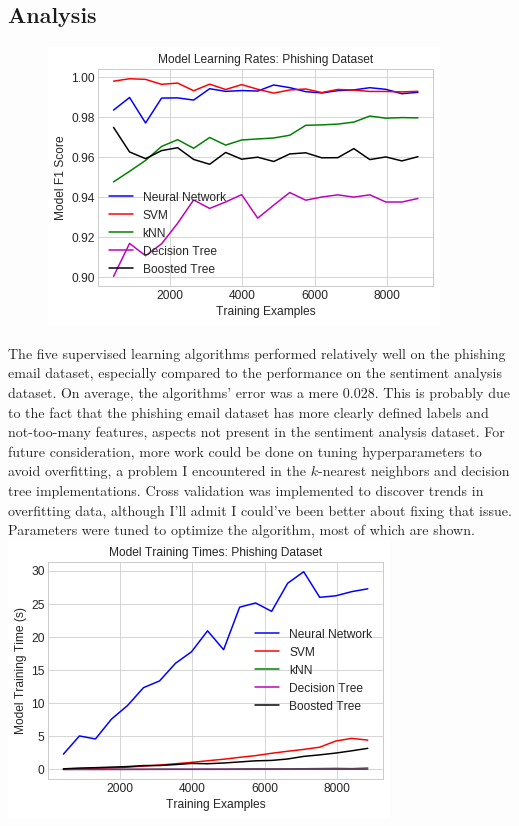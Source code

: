 \documentclass[11pt, a4paper]{article} %
\begin{document}
\subsection{Analysis}
\begin{figure}
\centering
\includegraphics[scale=0.525]{MLR.png}
\end{figure}
The five supervised learning algorithms performed relatively well on the phishing email dataset, especially compared to the performance on the sentiment analysis dataset. On average, the algorithms' error was a mere 0.028. This is probably due to the fact that the phishing email dataset has more clearly defined labels and not-too-many features, aspects not present in the sentiment analysis dataset. For future consideration, more work could be done on tuning hyperparameters to avoid overfitting, a problem I encountered in the $k$-nearest neighbors and decision tree implementations. Cross validation was implemented to discover trends in overfitting data, although I'll admit I could've been better about fixing that issue. Parameters were tuned to optimize the algorithm, most of which are shown.
\newline
\newline
\includegraphics[scale=0.55]{Time_Comparison.png}
\end{document}
